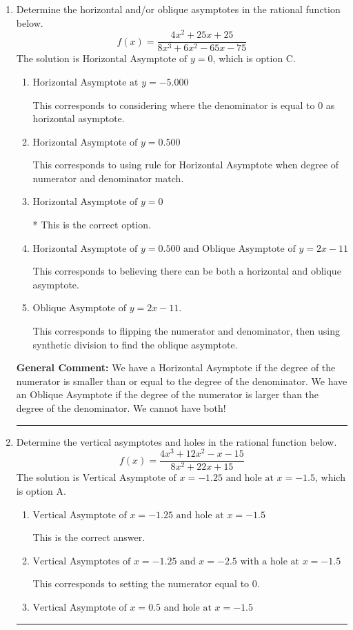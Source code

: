\documentclass{extbook}[14pt]
\newcommand{\litem}[1]{\item #1

\rule{\textwidth}{0.4pt}}
\begin{document}
\begin{enumerate}\litem{
Determine the horizontal and/or oblique asymptotes in the rational function below.
\[ f(x) = \frac{4x^{2} +25 x + 25}{8x^{3} +6 x^{2} -65 x -75} \]The solution is \( \text{Horizontal Asymptote of } y = 0 \), which is option C.\begin{enumerate}[label=\Alph*.]
\item \( \text{Horizontal Asymptote at } y = -5.000 \)

This corresponds to considering where the denominator is equal to 0 as horizontal asymptote.
\item \( \text{Horizontal Asymptote of } y = 0.500  \)

This corresponds to using rule for Horizontal Asymptote when degree of numerator and denominator match.
\item \( \text{Horizontal Asymptote of } y = 0 \)

* This is the correct option.
\item \( \text{Horizontal Asymptote of } y = 0.500 \text{ and Oblique Asymptote of } y = 2x -11 \)

This corresponds to believing there can be both a horizontal and oblique asymptote.
\item \( \text{Oblique Asymptote of } y = 2x -11. \)

This corresponds to flipping the numerator and denominator, then using synthetic division to find the oblique asymptote.
\end{enumerate}

\textbf{General Comment:} We have a Horizontal Asymptote if the degree of the numerator is smaller than or equal to the degree of the denominator. We have an Oblique Asymptote if the degree of the numerator is larger than the degree of the denominator. We cannot have both!
}
\litem{
Determine the vertical asymptotes and holes in the rational function below.
\[ f(x) = \frac{4x^{3} +12 x^{2} -x -15}{8x^{2} +22 x + 15} \]The solution is \( \text{Vertical Asymptote of } x = -1.25 \text{ and hole at } x = -1.5 \), which is option A.\begin{enumerate}[label=\Alph*.]
\item \( \text{Vertical Asymptote of } x = -1.25 \text{ and hole at } x = -1.5 \)

This is the correct answer.
\item \( \text{Vertical Asymptotes of } x = -1.25 \text{ and } x = -2.5 \text{ with a hole at } x = -1.5 \)

This corresponds to setting the numerator equal to 0.
\item \( \text{Vertical Asymptote of } x = 0.5 \text{ and hole at } x = -1.5 \)


\end{enumerate}}
\end{enumerate}
\end{document}
